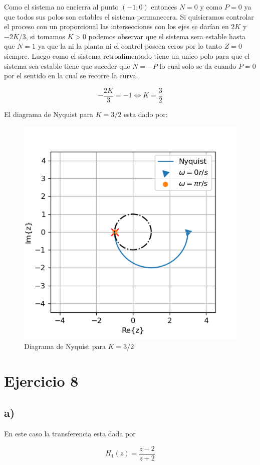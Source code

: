 \documentclass{article}
\begin{document}
            Como el sistema no encierra al punto $(-1;0)$ entonces $N=0$ y como $P=0$ ya que todos sus polos son estables el sistema permanecera. Si quisieramos controlar 
            el proceso con un proporcional las intersecciones con los ejes se darían en $2K$ y $-2K/3$, si tomamos $K>0$ podemos observar que el sistema sera 
            estable hasta que $N=1$ ya que la ni la planta ni el control poseen ceros por lo tanto $Z=0$ siempre. Luego como el sistema retroalimentado tiene 
            un unico polo para que el sistema sea estable tiene que suceder que $N=-P$ lo cual solo se da cuando $P=0$ por el sentido en la cual se recorre la curva.

            \begin{equation}
                -\frac{2K}{3} = -1 \Leftrightarrow K = \frac{3}{2}
            \end{equation}

            El diagrama de Nyquist para $K=3/2$ esta dado por:

            \begin{figure}[H]
                \centering
                \includegraphics[width=.4\textwidth]{Img/7-1.png}
                \caption{Diagrama de Nyquist para $K=3/2$}
                \label{}
            \end{figure}

    \section{Ejercicio 8}
    
        \subsection{a)}

            En este caso la transferencia esta dada por 

            \begin{equation}
                H_1(z) = \frac{z-2}{z+2}
            \end{equation}
\end{document}
